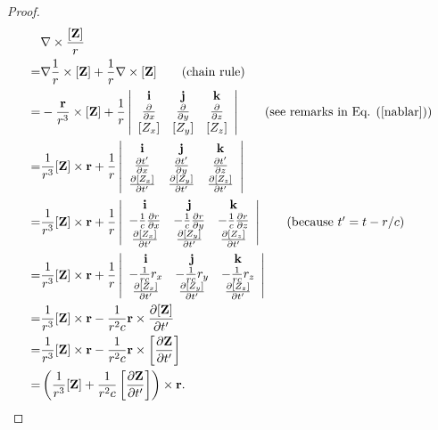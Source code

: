 \documentclass[11pt]{article}              %
\begin{document}
\begin{proof}
\begin{align}
    &\nabla\times\frac{[{\mathbf Z}]}{r}\notag\\
    =&\nabla\frac{1}{r}\times[{\mathbf Z}]+\frac{1}{r}\nabla\times[{\mathbf Z}]\tag{chain rule}\\
    =&-\frac{\mathbf r}{r^3}\times[{\mathbf Z}]+
    \frac{1}{r}
    \left|\begin{array}{ccc}{\mathbf i}&{\mathbf j}&{\mathbf k}\\ 
    \frac{\partial}{\partial x}&\frac{\partial}{\partial y}&\frac{\partial}{\partial z}\\
    {[}Z_x]&[Z_y]&[Z_z]\\\end{array}\right|
    \tag{see remarks in Eq. (\ref{nablar})}\\
    =&\frac{1}{r^3}[{\mathbf Z}]\times{\mathbf r}+\frac{1}{r}
    \left|\begin{array}{ccc}{\mathbf i}&{\mathbf j}&{\mathbf k}\\ 
    \frac{\partial t^\prime}{\partial x}&\frac{\partial t^\prime}{\partial y}&\frac{\partial t^\prime}{\partial z}\\
    \frac{\partial [Z_x]}{\partial t^\prime}&\frac{\partial [Z_y]}{\partial t^\prime}&\frac{\partial [Z_z]}{\partial t^\prime}\end{array}\right|\notag\\
    =&\frac{1}{r^3}[{\mathbf Z}]\times{\mathbf r}+\frac{1}{r}
    \left|\begin{array}{ccc}{\mathbf i}&{\mathbf j}&{\mathbf k}\\ 
    -\frac{1}{c}\frac{\partial r}{\partial x}&-\frac{1}{c}\frac{\partial r}{\partial y}&-\frac{1}{c}\frac{\partial r}{\partial z}\\
    \frac{\partial [Z_x]}{\partial t^\prime}&\frac{\partial [Z_y]}{\partial t^\prime}&\frac{\partial [Z_z]}{\partial t^\prime}\end{array}\right|\tag{because $t^\prime=t-r/c$}\\
    =&\frac{1}{r^3}[{\mathbf Z}]\times{\mathbf r}+\frac{1}{r}
    \left|\begin{array}{ccc}{\mathbf i}&{\mathbf j}&{\mathbf k}\\ 
    -\frac{1}{rc}r_x&-\frac{1}{rc}r_y&-\frac{1}{rc}r_z\\
    \frac{\partial [Z_x]}{\partial t^\prime}&\frac{\partial [Z_y]}{\partial t^\prime}&\frac{\partial [Z_z]}{\partial t^\prime}\end{array}\right|\notag\notag\\
    =&\frac{1}{r^3}[{\mathbf Z}]\times{\mathbf r}- \frac{1}{r^2c}{\mathbf r}\times\frac{\partial [{\mathbf Z}]}{\partial t^\prime}\notag\\ 
    =&\frac{1}{r^3}[{\mathbf Z}]\times{\mathbf r}- \frac{1}{r^2c}{\mathbf r}\times\left[\frac{\partial {\mathbf Z}}{\partial t^\prime}\right]\notag\\
    =&\left(\frac{1}{r^3}[{\mathbf Z}]+\frac{1}{r^2c}\left[\frac{\partial {\mathbf Z}}{\partial t^\prime}\right]\right)\times {\mathbf r}.
    \notag
\end{align}
\end{proof}



\end{document}

